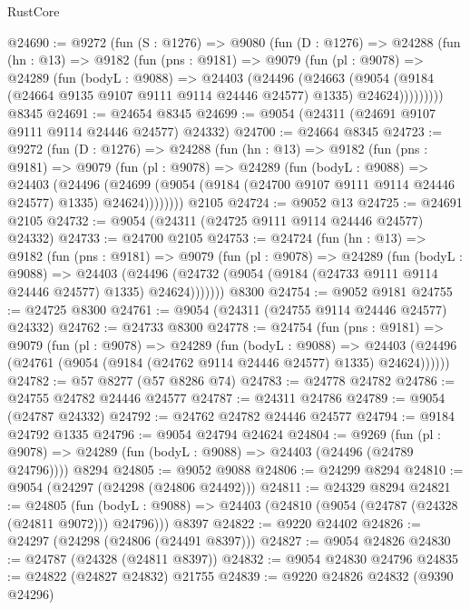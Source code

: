\begin{lexlean}{RustCore}
\begin{coremodule}
@24690 := @9272
    (fun (S : @1276) =>
    @9080
      (fun (D : @1276) =>
      @24288
        (fun (hn : @13) =>
        @9182
          (fun (pns : @9181) =>
          @9079
            (fun (pl : @9078) =>
            @24289
              (fun (bodyL : @9088) =>
              @24403
                (@24496
                  (@24663
                    (@9054
                      (@9184 (@24664 @9135 @9107 @9111 @9114 @24446 @24577) @1335)
                      @24624)))))))))
    @8345
@24691 := @24654 @8345
@24699 := @9054 (@24311 (@24691 @9107 @9111 @9114 @24446 @24577) @24332)
@24700 := @24664 @8345
@24723 := @9272
    (fun (D : @1276) =>
    @24288
      (fun (hn : @13) =>
      @9182
        (fun (pns : @9181) =>
        @9079
          (fun (pl : @9078) =>
          @24289
            (fun (bodyL : @9088) =>
            @24403
              (@24496
                (@24699 (@9054 (@9184 (@24700 @9107 @9111 @9114 @24446 @24577) @1335) @24624))))))))
    @2105
@24724 := @9052 @13
@24725 := @24691 @2105
@24732 := @9054 (@24311 (@24725 @9111 @9114 @24446 @24577) @24332)
@24733 := @24700 @2105
@24753 := @24724
    (fun (hn : @13) =>
    @9182
      (fun (pns : @9181) =>
      @9079
        (fun (pl : @9078) =>
        @24289
          (fun (bodyL : @9088) =>
          @24403
            (@24496 (@24732 (@9054 (@9184 (@24733 @9111 @9114 @24446 @24577) @1335) @24624)))))))
    @8300
@24754 := @9052 @9181
@24755 := @24725 @8300
@24761 := @9054 (@24311 (@24755 @9114 @24446 @24577) @24332)
@24762 := @24733 @8300
@24778 := @24754
    (fun (pns : @9181) =>
    @9079
      (fun (pl : @9078) =>
      @24289
        (fun (bodyL : @9088) =>
        @24403 (@24496 (@24761 (@9054 (@9184 (@24762 @9114 @24446 @24577) @1335) @24624))))))
@24782 := @57 @8277 (@57 @8286 @74)
@24783 := @24778 @24782
@24786 := @24755 @24782 @24446 @24577
@24787 := @24311 @24786
@24789 := @9054 (@24787 @24332)
@24792 := @24762 @24782 @24446 @24577
@24794 := @9184 @24792 @1335
@24796 := @9054 @24794 @24624
@24804 := @9269
    (fun (pl : @9078) => @24289 (fun (bodyL : @9088) => @24403 (@24496 (@24789 @24796))))
    @8294
@24805 := @9052 @9088
@24806 := @24299 @8294
@24810 := @9054 (@24297 (@24298 (@24806 @24492)))
@24811 := @24329 @8294
@24821 := @24805
    (fun (bodyL : @9088) => @24403 (@24810 (@9054 (@24787 (@24328 (@24811 @9072))) @24796)))
    @8397
@24822 := @9220 @24402
@24826 := @24297 (@24298 (@24806 (@24491 @8397)))
@24827 := @9054 @24826
@24830 := @24787 (@24328 (@24811 @8397))
@24832 := @9054 @24830 @24796
@24835 := @24822 (@24827 @24832) @21755
@24839 := @9220 @24826 @24832 (@9390 @24296)

\end{coremodule}
\end{lexlean}
